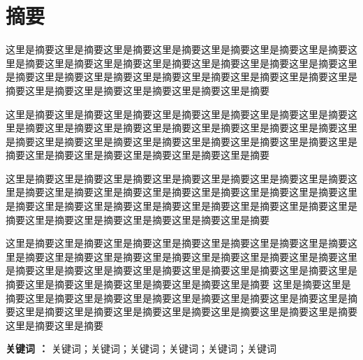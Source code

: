 

\chapter*{\heiti{} 摘\quad 要}
{
	\songti{}

这里是摘要这里是摘要这里是摘要这里是摘要这里是摘要这里是摘要这里是摘要这里是摘要这里是摘要这里是摘要这里是摘要这里是摘要这里是摘要这里是摘要这里是摘要这里是摘要这里是摘要这里是摘要这里是摘要这里是摘要这里是摘要这里是摘要这里是摘要这里是摘要这里是摘要这里是摘要这里是摘要

这里是摘要这里是摘要这里是摘要这里是摘要这里是摘要这里是摘要这里是摘要这里是摘要这里是摘要这里是摘要这里是摘要这里是摘要这里是摘要这里是摘要这里是摘要这里是摘要这里是摘要这里是摘要这里是摘要这里是摘要这里是摘要这里是摘要这里是摘要这里是摘要这里是摘要这里是摘要这里是摘要

这里是摘要这里是摘要这里是摘要这里是摘要这里是摘要这里是摘要这里是摘要这里是摘要这里是摘要这里是摘要这里是摘要这里是摘要这里是摘要这里是摘要这里是摘要这里是摘要这里是摘要这里是摘要这里是摘要这里是摘要这里是摘要这里是摘要这里是摘要这里是摘要这里是摘要这里是摘要这里是摘要

这里是摘要这里是摘要这里是摘要这里是摘要这里是摘要这里是摘要这里是摘要这里是摘要这里是摘要这里是摘要这里是摘要这里是摘要这里是摘要这里是摘要这里是摘要这里是摘要这里是摘要这里是摘要这里是摘要这里是摘要这里是摘要这里是摘要这里是摘要这里是摘要这里是摘要这里是摘要这里是摘要
这里是摘要这里是摘要这里是摘要这里是摘要这里是摘要这里是摘要这里是摘要这里是摘要这里是摘要这里是摘要这里是摘要这里是摘要这里是摘要这里是摘要这里是摘要这里是摘要这里是摘要这里是摘要

}
\vspace*{2.5cm}
{\noindent\bfseries 关键词 ：}  
关键词；关键词；关键词；关键词；关键词；关键词




